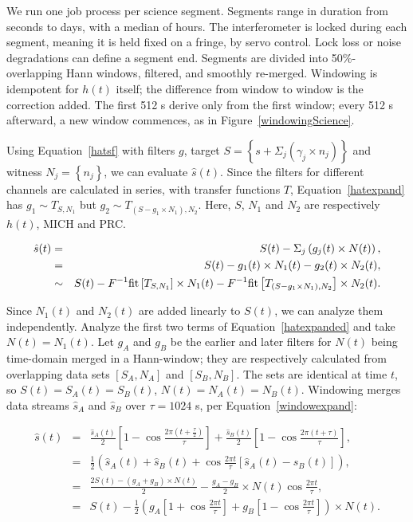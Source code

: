 We run one job process per science segment. Segments range in duration from seconds to days, with a median of hours. The interferometer is locked during each segment, meaning it is held fixed on a fringe, by servo control. Lock loss or noise degradations can define a segment end. Segments are divided into 50\%-overlapping Hann windows, filtered, and smoothly re-merged. Windowing is idempotent for $h(t)$ itself; the difference from window to window is the correction added. The first 512 s derive only from the first window; every 512 s afterward, a new window commences, as in Figure~\ref{windowingScience}.

Using Equation~\ref{hatsf} with filters $g$, target $S = \left\{ s + \Sigma_j \left(\gamma_j \times n_j\right)\right\}$ and witness $N_j = \left\{ n_{j} \right\}$, we can evaluate  $\hat{s} (t)$. Since the filters for different channels are calculated in series, with transfer functions $T$, Equation~\ref{hatexpand} has $g_1 \sim T_{S,N_1}$ but $g_2 \sim T_{\left( S-g_1 \times N_1 \right),N_2}$. Here, $S$, $N_1$ and $N_2$ are respectively $h(t)$, MICH and PRC.

            \begin{eqnarray}
            \hat{s} (t) &=& S (t) - \Sigma_j \left(g_{j} (t) \times N (t)\right) \label{hatexpand}, \\
		&=& S (t) - g_1 (t) \times N_1 (t) - g_2 (t) \times N_2 (t) \label{hatexpanded},\\
&\sim& S (t) - F^{-1} \textup{fit}\left[ T_{S,N_1} \right] \times N_1 (t) - F^{-1} \textup{fit}\left[T_{\left( S-g_1 \times N_1 \right),N_2} \right] \times N_2 (t).
            \end{eqnarray} 
		

	Since $N_1(t)$ and $N_2(t)$ are added linearly to $S(t)$, we can analyze them independently. 
Analyze the first two terms of Equation~\ref{hatexpanded} and take $N(t) = N_1(t)$. Let $g_{A}$ and $g_{B}$ be the earlier and later filters for $N(t)$ being time-domain merged in a Hann-window; they are respectively calculated from overlapping data sets $[S_A, N_A]$ and $[S_B, N_B]$. The sets are identical at time $t$, so $S(t)=S_A(t) = S_B(t)$, $N(t)=N_A(t) = N_B(t)$. Windowing merges data streams $\hat{s}_A$ and $\hat{s}_B$ over $\tau = 1024$ s, per Equation~\ref{windowexpand}: 

	\begin{eqnarray}
        \hat{s} (t) &=& \frac{\hat{s}_A (t)}{2} \left[1 - \cos \frac{2 \pi (t+\frac{\tau}{2})}{\tau} \right] + \frac{\hat{s}_B (t)}{2}\left[1 - \cos \frac{2 \pi (t+\tau)}{\tau} \right] \label{windowexpand}, \\
	  &=& \frac{1}{2} \left( \hat{s}_A (t) + \hat{s}_B (t) + \cos \frac{2 \pi t}{\tau} \left[\hat{s}_A (t) - \hat{s}_B (t) \right]\right),\\
	&=& \frac{2 S(t) - (g_{A} + g_{B})\times N(t)}{2} - \frac{g_{A} - g_{B}}{2} \times N(t) \cos \frac{2 \pi t}{\tau},\\
          &=& S(t) - \frac{1}{2} \left( g_{A} \left [1 + \cos \frac{2 \pi t}{\tau} \right] + g_{B} \left [1 - \cos \frac{2 \pi t}{\tau} \right] \right) \times N (t) \label{windowexpanded}.
	\end{eqnarray}

